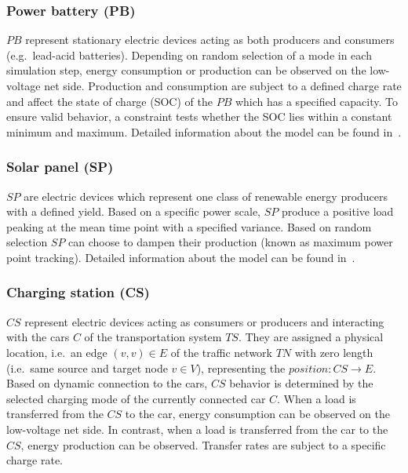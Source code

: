 \subsubsection*{Power battery (PB)}

$PB$ represent stationary electric devices acting as both producers and consumers (e.g.\ lead-acid batteries). 
Depending on random selection of a mode in each simulation step, energy consumption or production can be observed on the low-voltage net side. Production and consumption are subject to a defined charge rate and affect the state of charge (SOC) of the $PB$ which has a specified capacity.
To ensure valid behavior, a constraint tests whether the SOC lies within a constant minimum and maximum. Detailed information about the model can be found in~\cite{hackenberg2014rapid}.

\subsubsection*{Solar panel (SP)}

$SP$ are electric devices which represent one class of renewable energy producers with a defined yield. Based on a specific power scale, $SP$ produce a positive load peaking at the mean time point with a specified variance. Based on random selection $SP$ can choose to dampen their production (known as maximum power point tracking). Detailed information about the model can be found in~\cite{hackenberg2014rapid}.

\subsubsection*{Charging station (CS)}
\label{section:charging_station}

$CS$ represent electric devices acting as consumers or producers and interacting with the cars $C$ of the transportation system $TS$. They are assigned a physical location, i.e.\ an edge $(v,v) \in E$ of the traffic network $TN$ with zero length (i.e.\ same source and target node $v \in V$), representing the
$\mathit{position}: CS \to E$. 
 Based on dynamic connection to the cars, $CS$ behavior is determined by the selected charging mode of the currently connected car $C$. 
 When a load is transferred from the $CS$ to the car, energy consumption can be observed on the low-voltage net side. In contrast, when a load is transferred from the car to the $CS$, energy production can be observed. Transfer rates are subject to a specific charge rate.